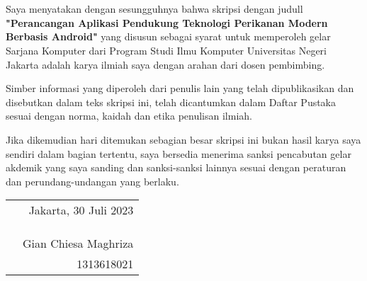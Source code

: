 \chapter*{}

Saya menyatakan dengan sesungguhnya bahwa skripsi dengan judull \textbf{"Perancangan Aplikasi Pendukung Teknologi Perikanan Modern Berbasis Android"} yang disusun sebagai syarat untuk memperoleh gelar Sarjana Komputer dari Program Studi Ilmu Komputer Universitas Negeri Jakarta adalah karya ilmiah saya dengan arahan dari dosen pembimbing.

Simber informasi yang diperoleh dari penulis lain yang telah dipublikasikan dan disebutkan dalam teks skripsi ini, telah dicantumkan dalam Daftar Pustaka sesuai dengan norma, kaidah dan etika penulisan ilmiah.

Jika dikemudian hari ditemukan sebagian besar skripsi ini bukan hasil karya saya sendiri dalam bagian tertentu, saya bersedia menerima sanksi pencabutan gelar akdemik yang saya sanding dan sanksi-sanksi lainnya sesuai dengan peraturan dan perundang-undangan yang berlaku.

\vspace{4cm}

\begin{tabular}{p{}r}
	&Jakarta, 30 Juli 2023\\
	&\\
	&\\
	&\\
	&Gian Chiesa Maghriza\\
	&1313618021              
\end{tabular}